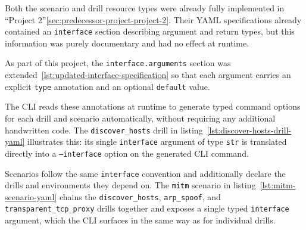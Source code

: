 Both the scenario and drill resource types were already fully implemented in \enquote{Project 2}\ref{sec:predecessor-project-project-2}.
Their \gls{YAML} specifications already contained an \texttt{interface} section describing argument and return types, but this information was purely documentary and had no effect at runtime.

As part of this project, the \texttt{interface.arguments} section was extended~\ref{lst:updated-interface-specification} so that each argument carries an explicit \texttt{type} annotation and an optional \texttt{default} value.


The \gls{CLI} reads these annotations at runtime to generate typed command options for each drill and scenario automatically, without requiring any additional handwritten code.
The \texttt{discover_hosts} drill in listing~\ref{lst:discover-hosts-drill-yaml} illustrates this: its single \texttt{interface} argument of type \texttt{str} is translated directly into a \texttt{--interface} option on the generated \gls{CLI} command.

Scenarios follow the same \texttt{interface} convention and additionally declare the drills and environments they depend on.
The \texttt{mitm} scenario in listing~\ref{lst:mitm-scenario-yaml} chains the \texttt{discover_hosts}, \texttt{arp_spoof}, and \texttt{transparent_tcp_proxy} drills together and exposes a single typed \texttt{interface} argument, which the \gls{CLI} surfaces in the same way as for individual drills.

